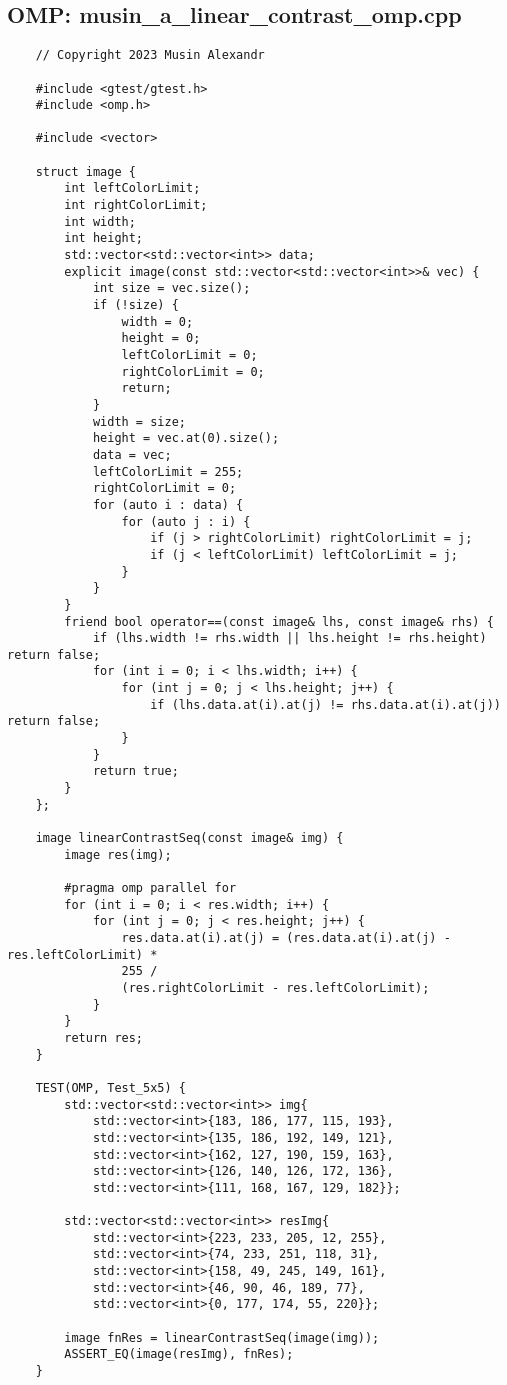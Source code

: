 \documentclass[14pt, russian]{extarticle}
\begin{document}
	\subsection{OMP: musin\_a\_linear\_contrast\_omp.cpp}
	\begin{lstlisting}
	// Copyright 2023 Musin Alexandr
	
	#include <gtest/gtest.h>
	#include <omp.h>
	
	#include <vector>
	
	struct image {
		int leftColorLimit;
		int rightColorLimit;
		int width;
		int height;
		std::vector<std::vector<int>> data;
		explicit image(const std::vector<std::vector<int>>& vec) {
			int size = vec.size();
			if (!size) {
				width = 0;
				height = 0;
				leftColorLimit = 0;
				rightColorLimit = 0;
				return;
			}
			width = size;
			height = vec.at(0).size();
			data = vec;
			leftColorLimit = 255;
			rightColorLimit = 0;
			for (auto i : data) {
				for (auto j : i) {
					if (j > rightColorLimit) rightColorLimit = j;
					if (j < leftColorLimit) leftColorLimit = j;
				}
			}
		}
		friend bool operator==(const image& lhs, const image& rhs) {
			if (lhs.width != rhs.width || lhs.height != rhs.height) return false;
			for (int i = 0; i < lhs.width; i++) {
				for (int j = 0; j < lhs.height; j++) {
					if (lhs.data.at(i).at(j) != rhs.data.at(i).at(j)) return false;
				}
			}
			return true;
		}
	};
	
	image linearContrastSeq(const image& img) {
		image res(img);
		
		#pragma omp parallel for
		for (int i = 0; i < res.width; i++) {
			for (int j = 0; j < res.height; j++) {
				res.data.at(i).at(j) = (res.data.at(i).at(j) - res.leftColorLimit) *
				255 /
				(res.rightColorLimit - res.leftColorLimit);
			}
		}
		return res;
	}
	
	TEST(OMP, Test_5x5) {
		std::vector<std::vector<int>> img{
			std::vector<int>{183, 186, 177, 115, 193},
			std::vector<int>{135, 186, 192, 149, 121},
			std::vector<int>{162, 127, 190, 159, 163},
			std::vector<int>{126, 140, 126, 172, 136},
			std::vector<int>{111, 168, 167, 129, 182}};
		
		std::vector<std::vector<int>> resImg{
			std::vector<int>{223, 233, 205, 12, 255},
			std::vector<int>{74, 233, 251, 118, 31},
			std::vector<int>{158, 49, 245, 149, 161},
			std::vector<int>{46, 90, 46, 189, 77},
			std::vector<int>{0, 177, 174, 55, 220}};
		
		image fnRes = linearContrastSeq(image(img));
		ASSERT_EQ(image(resImg), fnRes);
	}
	

\end{lstlisting}
\end{document}

